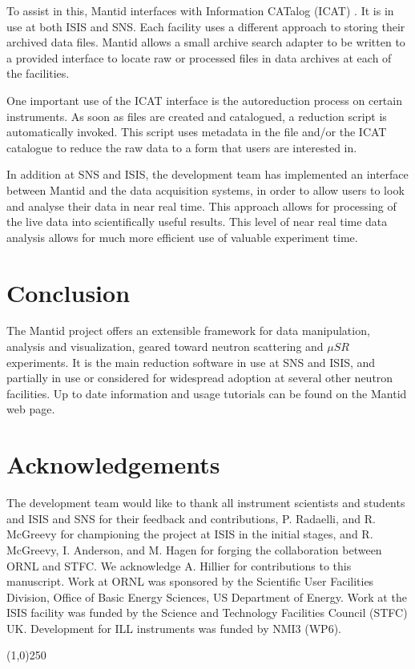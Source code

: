 \documentclass[1p]{elsarticle}
\begin{document}
To assist in this, Mantid interfaces with Information CATalog (ICAT) \cite{ICAT}. 
It is in use at both ISIS and SNS. Each facility uses a different approach to storing their archived data files. Mantid allows a small archive search adapter to be written to a provided interface to locate raw or processed files in data archives at each of the facilities.

One important use of the ICAT interface is the autoreduction process on certain instruments. As soon as files are created and catalogued, a reduction script is automatically invoked. This script uses metadata in the file and/or the ICAT catalogue to reduce the raw data to a form that users are interested in. 

In addition at SNS and ISIS, the development team has implemented an interface between Mantid and the data acquisition systems, in order to allow users to look and analyse their data in near real time. This approach allows for processing of the live data into scientifically useful results. This level of near real time data analysis allows for much more efficient use of valuable experiment time.  


\section{Conclusion}
The Mantid project offers an extensible framework for data manipulation, analysis and visualization, geared toward neutron scattering and $\mu SR$ experiments. It is the main reduction software in use at SNS and ISIS, and partially in use or considered for widespread adoption at several other neutron facilities. Up to date information and usage tutorials can be found on the Mantid web page\cite{webpage}. 

\section{Acknowledgements}
The development team would like to thank all instrument scientists and students and ISIS and SNS for their feedback and contributions, P. Radaelli, and R. McGreevy for championing the project at ISIS in the initial stages, and R. McGreevy, I. Anderson, and M. Hagen for forging the collaboration between ORNL and STFC. We acknowledge A. Hillier for contributions to this manuscript. Work at ORNL was sponsored by the Scientific User Facilities Division, Office of Basic Energy Sciences, US Department of Energy. Work at the ISIS facility was funded by the Science and Technology Facilities Council (STFC) UK. Development for ILL instruments was funded by NMI3 (WP6).

\begin{center}
\line(1,0){250}
\end{center}


{}

\end{document}
